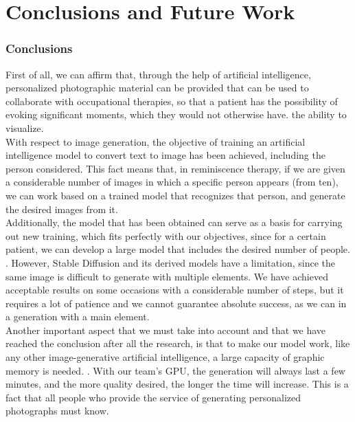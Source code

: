 \chapter*{Conclusions and Future Work}
\label{cap:conclusions}
\subsection{Conclusions}

First of all, we can affirm that, through the help of artificial intelligence, personalized photographic material can be provided that can be used to collaborate with occupational therapies, so that a patient has the possibility of evoking significant moments, which they would not otherwise have. the ability to visualize.\\

With respect to image generation, the objective of training an artificial intelligence model to convert text to image has been achieved, including the person considered. This fact means that, in reminiscence therapy, if we are given a considerable number of images in which a specific person appears (from ten), we can work based on a trained model that recognizes that person, and generate the desired images from it.\\

Additionally, the model that has been obtained can serve as a basis for carrying out new training, which fits perfectly with our objectives, since for a certain patient, we can develop a large model that includes the desired number of people. . However, Stable Diffusion and its derived models have a limitation, since the same image is difficult to generate with multiple elements. We have achieved acceptable results on some occasions with a considerable number of steps, but it requires a lot of patience and we cannot guarantee absolute success, as we can in a generation with a main element.\\

Another important aspect that we must take into account and that we have reached the conclusion after all the research, is that to make our model work, like any other image-generative artificial intelligence, a large capacity of graphic memory is needed. . With our team's GPU, the generation will always last a few minutes, and the more quality desired, the longer the time will increase. This is a fact that all people who provide the service of generating personalized photographs must know.\\

